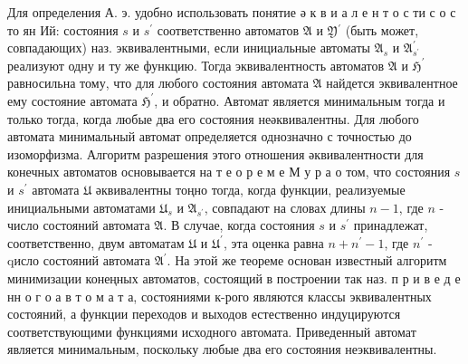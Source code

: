 \documentclass[10pt]{article}
\begin{document}
Для определения А. э. удобно использовать понятие ә к в и а л е н т о с ти с о с то ян Ий: состояния $s$ и $s^{\prime}$ соответственно автоматов $\mathfrak{A}$ и $\mathfrak{Y}{ }^{\prime}$ (быть может, совпадающих) наз. эквивалентными, если инициальные автоматы $\mathfrak{A}_{s}$ и $\mathfrak{A}_{s^{\prime}}^{\prime}$ реализуют одну и ту же функцию. Тогда эквивалентность автоматов $\mathfrak{A}$ и $\mathfrak{H}^{\prime}$ равносильна тому, что для любого состояния автомата $\mathfrak{A}$ найдется эквивалентное ему состояние автомата $\mathfrak{H}^{\prime}$, и обратно. Автомат является минимальным тогда и только тогда, когда любые два его состояния неәквивалентны. Для любого автомата минимальный автомат определяется однозначно с точностью до изоморфизма. Алгоритм разрешения этого отношения әквивалентности для конечных автоматов основывается на т е о р е м е М у р а о том, что состояния $s$ и $s^{\prime}$ автомата $\mathfrak{U}$ әквивалентны тоңно тогда, когда функции, реализуемые инициальными автоматами $\mathfrak{U}_{s}$ и $\mathfrak{A}_{s^{\prime}}$, совпадают на словах длины $n-1$, где $n$ - число состояний автомата $\mathfrak{A}$. В случае, когда состояния $s$ и $s^{\prime}$ принадлежат, соответственно, двум автоматам $\mathfrak{U}$ и $\mathfrak{U}^{\prime}$, эта оценка равна $n+n^{\prime}-1$, где $n^{\prime}$ - qисло состояний автомата $\mathfrak{A}^{\prime}$. На этой же теореме основан известный алгоритм минимизации конеңных автоматов, состоящий в построении так наз. п р и в е д е нн о г о а в т о м а т а, состояниями к-рого являются классы эквивалентных состояний, а функции переходов и выходов естественно индуцируются соответствующими функциями исходного автомата. Приведенный автомат является минимальным, поскольку любые два его состояния неэквивалентны.
\end{document}
